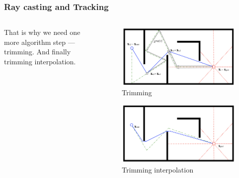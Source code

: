 \documentclass[
    11pt, %
    aspectratio=169, %
]{beamer}
\begin{document}
\begin{frame}
    \frametitle{Ray casting and Tracking}

    \begin{columns}[c]
        \begin{column}{0.5\textwidth}
            That is why we need one more algorithm step --- trimming.
            \newline\newline
            And finally trimming interpolation.
        \end{column}
        \begin{column}{0.5\textwidth}
            \begin{figure}
                \includegraphics[scale=0.23]{assets/rct-trimming.png}
                \caption{Trimming}
            \end{figure}
            \begin{figure}
                \includegraphics[scale=0.23]{assets/rct-int-trimming.png}
                \caption{Trimming interpolation}
            \end{figure}
        \end{column}
    \end{columns}

\end{frame}
\end{document}
